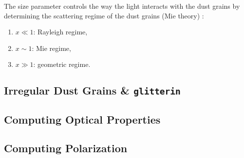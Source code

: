 The size parameter controls the way the light interacts with the dust grains by determining the scattering regime of the dust grains (Mie theory) \citep{Zhang2023}:
\begin{enumerate}
    \item $x \ll 1$: Rayleigh regime,
    \item $x \sim 1$: Mie regime,
    \item $x \gg 1$: geometric regime.
\end{enumerate}





\subsection{Irregular Dust Grains \& \texttt{glitterin}}
\label{sec: ch5_glitterin}










\subsection{Computing Optical Properties}










\subsection{Computing Polarization}







%
%
%
